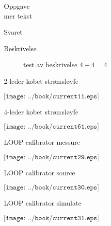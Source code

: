 \documentclass[avery5371,grid,frame]{flashcards}
\begin{document}


\begin{flashcard}{Oppgave \\ mer tekst}

	Svaret

  \smallskip

  \begin{description}
    \item [Beskrivelse]  test av beskrivelse $4+4=4$         
  \end{description}

  \smallskip
  \medskip

\end{flashcard}



\begin{flashcard}{2-leder kobet strømsløyfe}

$\texttt{[image: ../book/current11.eps]}$

\end{flashcard}


\begin{flashcard}{4-leder kobet strømsløyfe}

$\texttt{[image: ../book/current61.eps]}$

\end{flashcard}


\begin{flashcard}{LOOP calibrator messure}

$\texttt{[image: ../book/current29.eps]}$

\end{flashcard}

\begin{flashcard}{LOOP calibrator source}

$\texttt{[image: ../book/current30.eps]}$

\end{flashcard}

\begin{flashcard}{LOOP calibrator simulate}

$\texttt{[image: ../book/current31.eps]}$

\end{flashcard}
\end{document}

